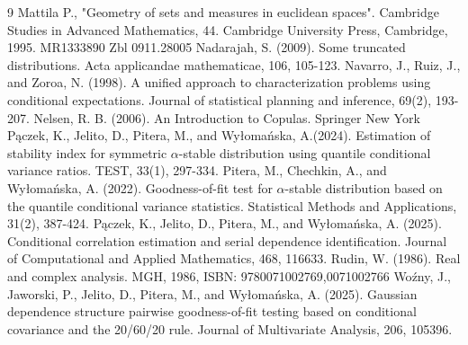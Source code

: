 \documentclass[sn-mathphys,Numbered,11pt]{sn-jnl}%
\theoremstyle{thmstyleone}%
\begin{document}
\begin{thebibliography}{9}
  Mattila P., "Geometry of sets and measures in euclidean spaces". Cambridge Studies in Advanced Mathematics, 44. Cambridge University Press, Cambridge, 1995. MR1333890 Zbl 0911.28005
 Nadarajah, S. (2009). Some truncated distributions. Acta applicandae mathematicae, 106, 105-123.
 Navarro, J., Ruiz, J., and Zoroa, N. (1998). A unified approach to characterization problems using conditional expectations. Journal of statistical planning and inference, 69(2), 193-207.
 Nelsen, R. B. (2006). An Introduction to Copulas. Springer New York
 P\k{a}czek, K., Jelito, D., Pitera, M., and Wy{\l}oma{\'n}ska, A.(2024). Estimation of stability index for symmetric $\alpha$-stable distribution using quantile conditional variance ratios. TEST, 33(1), 297-334.
Pitera, M., Chechkin, A., and Wy{\l}oma{\'n}ska, A. (2022). Goodness-of-fit test for $\alpha$-stable distribution based on the quantile conditional variance statistics. Statistical Methods and Applications, 31(2), 387-424.
P\k{a}czek, K., Jelito, D., Pitera, M., and Wy{\l}oma{\'n}ska, A. (2025). Conditional correlation estimation and serial dependence identification. Journal of Computational and Applied Mathematics, 468, 116633.
 Rudin, W. (1986). Real and complex analysis. MGH, 1986, ISBN: 9780071002769,0071002766
Wo{\'z}ny, J., Jaworski, P., Jelito, D., Pitera, M., and Wy{\l}oma{\'n}ska, A. (2025). Gaussian dependence structure pairwise goodness-of-fit testing based on conditional covariance and the 20/60/20 rule. Journal of Multivariate Analysis, 206, 105396.
\end{thebibliography}
\end{document}
